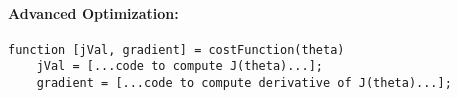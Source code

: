 \paragraph{Advanced Optimization:}
\begin{verbatim}
function [jVal, gradient] = costFunction(theta)
	jVal = [...code to compute J(theta)...];
	gradient = [...code to compute derivative of J(theta)...];
\end{verbatim}

